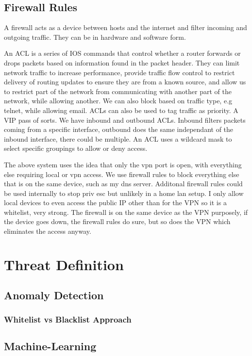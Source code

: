 \subsection{Firewall Rules}
A firewall acts as a device between hosts and the internet and filter incoming and outgoing traffic. They can be in hardware and software form.

An ACL is a series of IOS commands that control whether a router forwards or drops packets based on information found in the packet header. They can limit network traffic to increase performance, provide traffic flow control to restrict delivery of routing updates to 
ensure they are from a known source, and allow us to restrict part of the network from communicating with another part of the network, while allowing another. We can also block based on traffic type, e.g telnet, while allowing email. ACLs can also be used to tag traffic as priority. 
A VIP pass of sorts. We have inbound and outbound ACLs. Inbound filters packets coming from a specific interface, outbound does the same independant of the inbound interface, there could be multiple. An ACL uses a wildcard mask to select specific groupings to allow or deny access.

The above system uses the idea that only the vpn port is open, with everything else requiring local or vpn access. We use firewall rules to block everything else that is on the same device, such as my dns server. Additonal firewall rules could be used internally to stop priv esc 
but unlikely in a home lan setup. I only allow local devices to even access the public IP other than for the VPN so it is a whitelist, very strong. The firewall is on the same device as the VPN purposely, if the device goes down, the firewall rules do sure, but so does the VPN which eliminates the access anyway.

\section{Threat Definition}
\subsection{Anomaly Detection}
\subsubsection{Whitelist vs Blacklist Approach}
\subsection{Machine-Learning}
